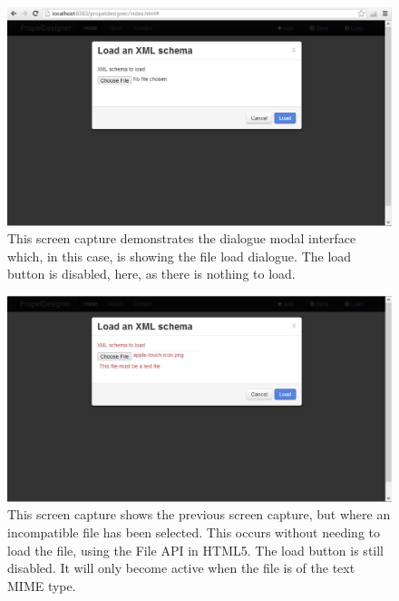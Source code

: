\begin{figure}[h!]
	\centering
	\includegraphics[width=15cm]{Images/open_file}
	\caption{This screen capture demonstrates the dialogue modal interface which, in this case, is showing the file load dialogue. The load button is disabled, here, as there is nothing to load.}
\end{figure}



\begin{figure}[h!]
	\centering
	\includegraphics[width=15cm]{Images/open_error}
	\caption{This screen capture shows the previous screen capture, but where an incompatible file has been selected. This occurs without needing to load the file, using the File API in HTML5. The load button is still disabled. It will only become active when the file is of the text MIME type.}
\end{figure}